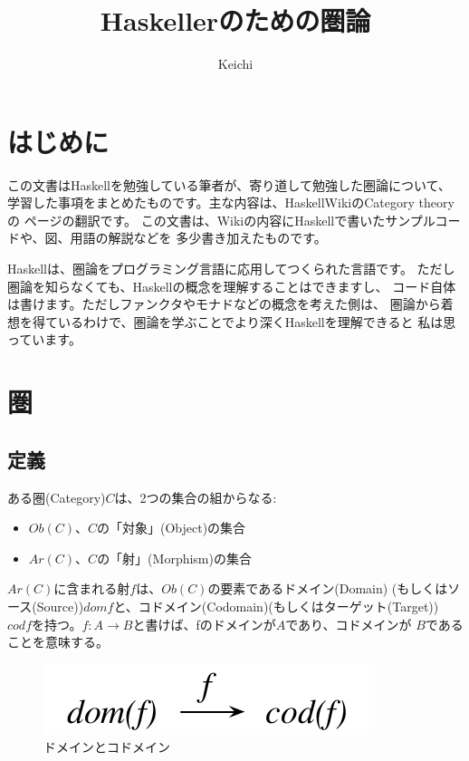 \documentclass{jsarticle}
\begin{document}
\title{Haskellerのための圏論}
\author{Keichi}
\maketitle

\section{はじめに}
この文書はHaskellを勉強している筆者が、寄り道して勉強した圏論について、
学習した事項をまとめたものです。主な内容は、HaskellWikiのCategory theoryの
ページ\cite{wiki}の翻訳です。
この文書は、Wikiの内容にHaskellで書いたサンプルコードや、図、用語の解説などを
多少書き加えたものです。

Haskellは、圏論をプログラミング言語に応用してつくられた言語です。
ただし圏論を知らなくても、Haskellの概念を理解することはできますし、
コード自体は書けます。ただしファンクタやモナドなどの概念を考えた側は、
圏論から着想を得ているわけで、圏論を学ぶことでより深くHaskellを理解できると
私は思っています。

\section{圏}

\subsection{定義}
ある圏(Category)$C$は、2つの集合の組からなる:

\begin{itemize}
    \item $Ob(C)$、$C$の「対象」(Object)の集合
    \item $Ar(C)$、$C$の「射」(Morphism)の集合
\end{itemize}

$Ar(C)$に含まれる射$f$は、$Ob(C)$の要素であるドメイン(Domain)
(もしくはソース(Source))$dom f$と、コドメイン(Codomain)(もしくはターゲット(Target))
$cod f$を持つ。$f:A \to B$と書けば、fのドメインが$A$であり、コドメインが
$B$であることを意味する。

\begin{figure}[htbp]
    \centering
    \includegraphics{diag_dom.pdf}
    \caption{ドメインとコドメイン}
\end{figure}
\end{document}
